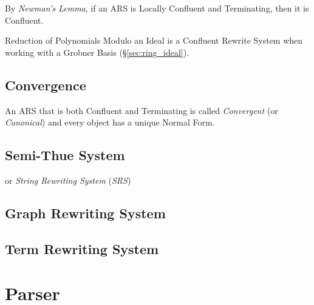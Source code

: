 By \emph{Newman's Lemma}, if an ARS is Locally Confluent and
Terminating, then it is Confluent.

Reduction of Polynomials Modulo an Ideal is a Confluent Rewrite System
when working with a Grobner Basis (\S\ref{sec:ring_ideal}).



\subsection{Convergence}\label{sec:rewrite_convergence}

An ARS that is both Confluent and Terminating is called
\emph{Convergent} (or \emph{Canonical}) and every object has a unique
Normal Form.



\subsection{Semi-Thue System}\label{sec:semithue_system}

or \emph{String Rewriting System} (\emph{SRS})



\subsection{Graph Rewriting System}\label{sec:graph_rewriting}



\subsection{Term Rewriting System}\label{sec:term_rewriting}



\section{Parser} \label{sec:parser}

